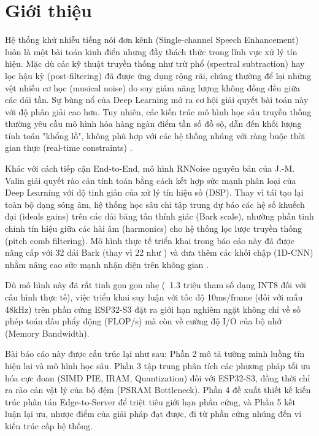 \section{Giới thiệu}
Hệ thống khử nhiễu tiếng nói đơn kênh (Single-channel Speech Enhancement) luôn là một bài toán kinh điển nhưng đầy thách thức trong lĩnh vực xử lý tín hiệu. Mặc dù các kỹ thuật truyền thống như trừ phổ (spectral subtraction) \cite{oppenheim1978evaluation} hay lọc hậu kỳ (post-filtering) \cite{chen1995adaptive} đã được ứng dụng rộng rãi, chúng thường để lại những vệt nhiễu cơ học (musical noise) do suy giảm năng lượng không đồng đều giữa các dải tần. Sự bùng nổ của Deep Learning mở ra cơ hội giải quyết bài toán này với độ phân giải cao hơn. Tuy nhiên, các kiến trúc mô hình học sâu truyền thống thường yêu cầu mô hình hóa hàng ngàn điểm tần số đồ sộ, dẫn đến khối lượng tính toán "khổng lồ", không phù hợp với các hệ thống nhúng với ràng buộc thời gian thực (real-time constraints) \cite{valin2018hybrid}. 

Khác với cách tiếp cận End-to-End, mô hình RNNoise nguyên bản của J.-M. Valin \cite{valin2018hybrid} giải quyết rào cản tính toán bằng cách kết hợp sức mạnh phân loại của Deep Learning với độ tinh giản của xử lý tín hiệu số (DSP). Thay vì tái tạo lại toàn bộ dạng sóng âm, hệ thống học sâu chỉ tập trung dự báo các hệ số khuếch đại (ideals gains) trên các dải băng tần thính giác (Bark scale), nhường phần tinh chỉnh tín hiệu giữa các hài âm (harmonics) cho hệ thống lọc lược truyền thống (pitch comb filtering). Mô hình thực tế triển khai trong báo cáo này đã được nâng cấp với 32 dải Bark (thay vì 22 như \cite{valin2018hybrid}) và đưa thêm các khối chập (1D-CNN) nhằm nâng cao sức mạnh nhận diện trên không gian \cite{valin2024noise}. 

Dù mô hình này đã rất tinh gọn gọn nhẹ (~1.3 triệu tham số dạng INT8 đối với cấu hình thực tế), việc triển khai suy luận với tốc độ 10ms/frame (đối với mẫu 48kHz) trên phần cứng ESP32-S3 đặt ra giới hạn nghiêm ngặt không chỉ về số phép toán dấu phẩy động (FLOP/s) mà còn về cường độ I/O của bộ nhớ (Memory Bandwidth).

Bài báo cáo này được cấu trúc lại như sau: Phần 2 mô tả tường minh luồng tín hiệu lai và mô hình học sâu. Phần 3 tập trung phân tích các phương pháp tối ưu hóa cực đoan (SIMD PIE, IRAM, Quantization) đối với ESP32-S3, đồng thời chỉ ra rào cản vật lý của bộ đệm (PSRAM Bottleneck). Phần 4 đề xuất thiết kế kiến trúc phân tán Edge-to-Server để triệt tiêu giới hạn phần cứng, và Phần 5 kết luận lại ưu, nhược điểm của giải pháp đạt được, đi từ phần cứng nhúng đến vi kiến trúc cấp hệ thống.
